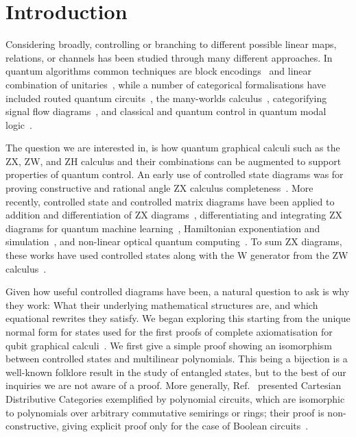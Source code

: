 \section{Introduction}
Considering broadly, controlling or branching to different possible linear maps, relations, or channels has been studied through many different approaches. In quantum algorithms common techniques are block encodings~\cite{gilyen2019qsvt, rall2020qalgsblockenc} and linear combination of unitaries~\cite{childs2012hamsimlcu}, while a number of categorical formalisations have included routed quantum circuits~\cite{vanrietvelde2021routed}, the many-worlds calculus~\cite{chardonnet2023manyworlds}, categorifying signal flow diagrams~\cite{baez2015categoriesctrl}, and classical and quantum control in quantum modal logic~\cite{sati2023quantummonadology}.

The question we are interested in, is how quantum graphical calculi such as the ZX, ZW, and ZH calculus and their combinations can be augmented to support properties of quantum control.
An early use of controlled state diagrams was for proving constructive and rational angle ZX calculus completeness~\cite{jeandel2018zxconstructive}. More recently, controlled state and controlled matrix diagrams have been applied to addition and differentiation of ZX diagrams~\cite{jeandel2024adddiffzx}, differentiating and integrating ZX diagrams for quantum machine learning~\cite{wang2022diffintzx}, Hamiltonian exponentiation and simulation~\cite{shaikh2022sum}, and non-linear optical quantum computing~\cite{de2023light}. To sum ZX diagrams, these works have used controlled states along with the W generator from the ZW calculus~\cite{coecke2010zw}.

Given how useful controlled diagrams have been, a natural question to ask is why they work: What their underlying mathematical structures are, and which equational rewrites they satisfy.
We began exploring this starting from the unique normal form for states used for the first proofs of complete axiomatisation for qubit graphical calculi~\cite{hadzihasanovic2017thesis, Hadzihasanovic2018zwzxcomplete}.
We first give a simple proof showing an isomorphism between controlled states and multilinear polynomials. This being a bijection is a well-known folklore result in the study of entangled states, but to the best of our inquiries we are not aware of a proof. More generally, Ref.~\cite{wilson2023diffpolycirc} presented Cartesian Distributive Categories exemplified by polynomial circuits, which are isomorphic to polynomials over arbitrary commutative semirings or rings; their proof is non-constructive, giving explicit proof only for the case of Boolean circuits~\cite{wilson2021revderbool}.

